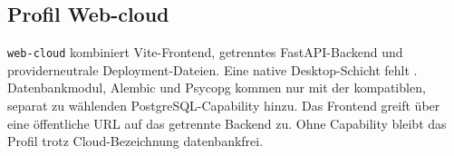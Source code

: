 \subsection{Profil Web-cloud}
\label{subsec:profil-web-cloud}

\texttt{web-cloud} kombiniert Vite-Frontend, getrenntes FastAPI-Backend und
providerneutrale Deployment-Dateien. Eine native Desktop-Schicht fehlt
\parencite{kleiveist2026deployment,kleiveist2026profiles}. Datenbankmodul,
Alembic und Psycopg kommen nur mit der kompatiblen, separat zu wählenden
PostgreSQL-Capability hinzu.
Das Frontend greift über eine öffentliche URL auf das getrennte Backend zu.
Ohne Capability bleibt das Profil trotz Cloud-Bezeichnung datenbankfrei.
